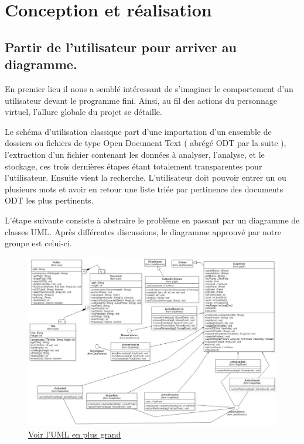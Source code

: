 \section{Conception et réalisation}

\subsection{Partir de l'utilisateur pour arriver au diagramme.}

En premier lieu il nous a semblé intéressant de s'imaginer le comportement d'un utilisateur devant le programme fini. Ainsi, au fil des actions du personnage virtuel,
l'allure globale du projet se détaille.  

Le schéma d'utilisation classique part d'une importation d'un ensemble de dossiers ou fichiers de type Open Document Text ( abrégé ODT par la suite ), l'extraction d'un fichier contenant les données à analyser, l'analyse, et le stockage, ces trois dernières étapes étant totalement transparentes pour l'utilisateur.
Ensuite vient la recherche. L'utilisateur doit pouvoir entrer un ou plusieurs mots et avoir en retour une liste triée par pertinence des documents ODT les plus pertinents. 

L'étape suivante consiste à abstraire le problème en passant par un diagramme de classes UML. Après différentes discussions, le diagramme approuvé par notre groupe est celui-ci.
 \begin{figure}[!ht]
	\center
	\includegraphics[width=\textwidth]{./images/uml.jpg}
	\caption{\href{http://uinelj.eu/misc/yolODT/uml.jpg}{Voir l'UML en plus grand}}
\end{figure}

